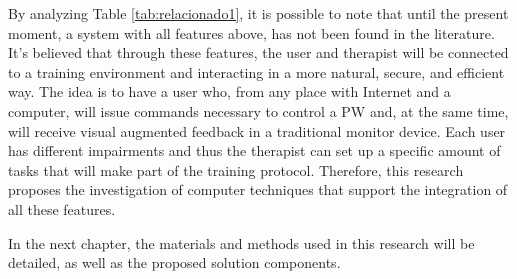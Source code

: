 By analyzing Table \ref{tab:relacionado1}, it is possible to note that until the present moment, a system with all features above, has not been found in the literature. It's believed that through these features, the user and therapist will be connected to a training environment and interacting in a more natural, secure, and efficient way. The idea is to have a user who, from any place with Internet and a computer, will issue commands necessary to control a PW and, at the same time, will receive visual augmented feedback in a traditional monitor device. Each user has different impairments and thus the therapist can set up a specific amount of tasks that will make part of the training protocol.  Therefore, this research proposes the investigation of computer techniques that support the integration of all these features.

In the next chapter, the materials and methods used in this research will be detailed, as well as the proposed solution components.

